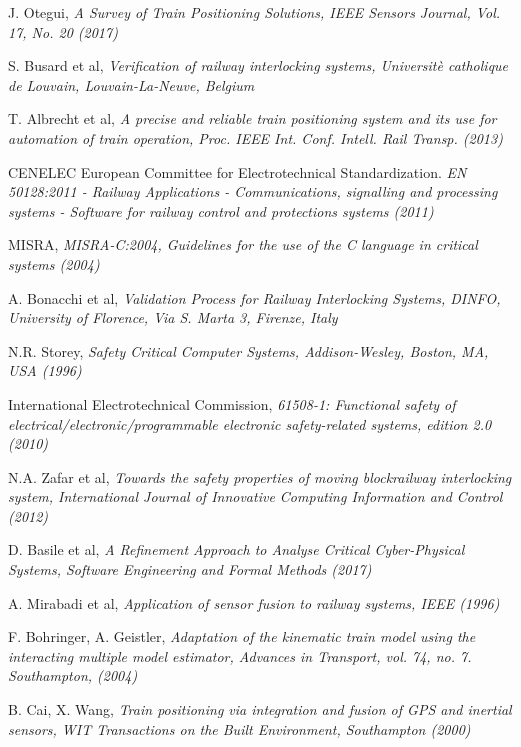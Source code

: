 \begin{thebibliography}{9}

J. Otegui, \textit{A Survey of Train Positioning Solutions, IEEE Sensors Journal, Vol. 17, No. 20 (2017)}

S. Busard et al, \textit{Verification of railway interlocking systems, Universit\`e catholique de Louvain, Louvain-La-Neuve, Belgium}

T. Albrecht et al, \textit{A precise and reliable train positioning system and its use for automation of train
operation, Proc. IEEE Int. Conf. Intell. Rail Transp. (2013)}

CENELEC European Committee for Electrotechnical Standardization. \textit{EN 50128:2011 - Railway Applications - Communications, signalling and processing systems - Software for railway control and protections systems (2011)}

MISRA, \textit{MISRA-C:2004, Guidelines for the use of the C language in critical systems (2004)}

A. Bonacchi et al, \textit{Validation Process for Railway Interlocking Systems, DINFO, University of Florence, Via S. Marta 3, Firenze, Italy}

N.R. Storey, \textit{Safety Critical Computer Systems,
Addison-Wesley, Boston, MA, USA (1996)}
	
International Electrotechnical Commission, \textit{61508-1: Functional safety of electrical/electronic/programmable electronic safety-related systems, edition 2.0 (2010)}

N.A. Zafar et al, \textit{Towards the safety properties of moving blockrailway interlocking system, International Journal of Innovative Computing Information and Control (2012)}

D. Basile et al, \textit{A Refinement Approach to Analyse Critical Cyber-Physical Systems,
Software Engineering and Formal Methods  (2017)}

A. Mirabadi et al, \textit{Application of sensor fusion to railway systems, IEEE (1996)}

F. Bohringer, A. Geistler, \textit{Adaptation of the kinematic train
	model using the interacting multiple model estimator, Advances in
	Transport, vol. 74, no. 7. Southampton, (2004)}

B. Cai, X. Wang, \textit{Train positioning via integration and
fusion of GPS and inertial sensors, WIT Transactions on the Built Environment, Southampton (2000)}


\end{thebibliography}
